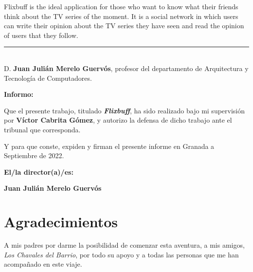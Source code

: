 Flixbuff is the ideal application for those who want to know what their friends think about the TV series of the moment. It is a social network in which users can write their opinion about the TV series they have seen and read the opinion of users that they follow.

\cleardoublepage{}

\thispagestyle{empty}

\noindent\rule[-1ex]{\textwidth}{2pt}\\[4.5ex]

D. \textbf{Juan Julián Merelo Guervós}, profesor del departamento de Arquitectura y Tecnología de Computadores.

\vspace{0.5cm}

\textbf{Informo:}

\vspace{0.5cm}

Que el presente trabajo, titulado \textit{\textbf{Flixbuff}},
ha sido realizado bajo mi supervisión por \textbf{Víctor Cabrita Gómez}, y autorizo la defensa de dicho trabajo ante el tribunal
que corresponda.

\vspace{0.5cm}

Y para que conste, expiden y firman el presente informe en Granada a Septiembre de 2022.

\vspace{1cm}

\textbf{El/la director(a)/es: }

\vspace{5cm}

\noindent \textbf{Juan Julián Merelo Guervós}

\chapter*{Agradecimientos}

A mis padres por darme la posibilidad de comenzar esta aventura, a mis amigos, \textit{Los Chavales del Barrio}, por todo su apoyo y a todas las personas que me han acompañado en este viaje.